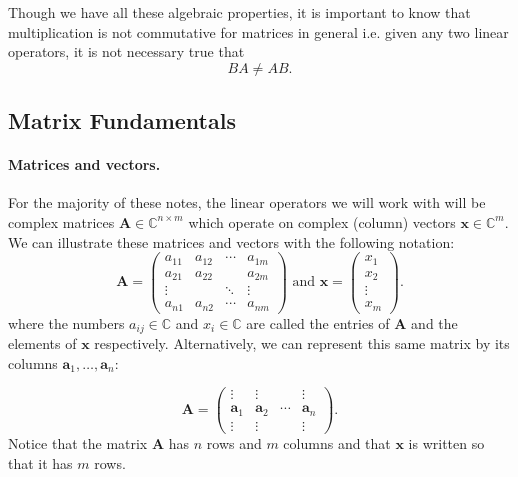 \documentclass[12pt]{article}
\newcommand{\bbC}{\mathbb{C}}
\renewcommand{\vec}[1]{\mathbf{#1}}
\theoremstyle{definition}
\theoremstyle{remark}
\numberwithin{equation}{section}
\begin{document}
Though we have all these algebraic properties, it is important to know that multiplication is not commutative for matrices in general i.e. given any two linear operators, it is not necessary true that
\begin{equation}
  BA \neq AB. 
\end{equation}

\subsection{Matrix Fundamentals}
\paragraph{Matrices and vectors.}
For the majority of these notes, the linear operators we will work with will be complex matrices $\vec{A} \in \bbC^{n \times m}$ which operate on complex (column) vectors $\vec{x}\in\bbC^m$. We can illustrate these matrices and vectors with the following notation:
\begin{equation}
  \vec{A} = \begin{pmatrix}
    a_{11} & a_{12} & \cdots & a_{1m} \\
    a_{21} & a_{22} &        & a_{2m} \\
    \vdots &        & \ddots & \vdots \\
    a_{n1} & a_{n2} & \cdots & a_{nm}
  \end{pmatrix} \text{ and } 
  \vec{x} = \begin{pmatrix}
  x_1 \\
  x_2 \\
  \vdots \\
  x_m
  \end{pmatrix}.
\end{equation}
where the numbers $a_{ij} \in \bbC$ and $x_i \in \bbC$ are called the entries of $\vec{A}$ and the elements of $\vec{x}$ respectively. Alternatively, we can represent this same matrix by its columns $\vec{a}_1, \ldots, \vec{a}_n$:

\begin{equation}
  \vec{A} = \begin{pmatrix}
    \vdots & \vdots &   & \vdots\\
    \vec{a}_1 & \vec{a}_2 & \cdots & \vec{a}_n \\
    \vdots & \vdots &  & \vdots
  \end{pmatrix}.
\end{equation}
Notice that the matrix $\vec{A}$ has $n$ rows and $m$ columns and that $\vec{x}$ is written so that it has $m$ rows. 
\end{document}

